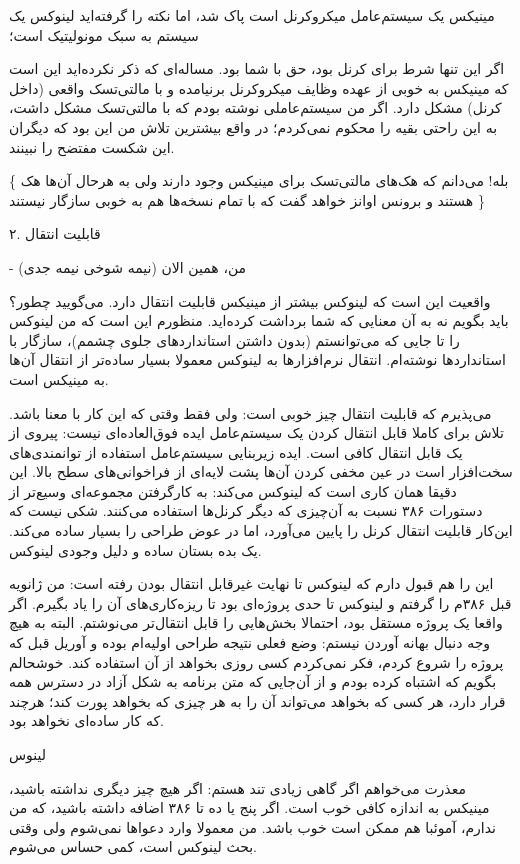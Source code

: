 \begin{emailbox}
مینیکس یک سیستم‌عامل میکروکرنل است {پاک شد، اما نکته را گرفته‌اید}
لینوکس یک سیستم به سبک مونولیتیک‌ است؛

اگر این تنها شرط برای  کرنل بود، حق با شما
بود. مساله‌ای که ذکر نکرده‌اید این است که مینیکس به خوبی از عهده وظایف
میکروکرنل برنیامده و با مالتی‌تسک واقعی (داخل کرنل) مشکل دارد. اگر من
سیستم‌عاملی نوشته بودم که با مالتی‌تسک مشکل داشت، به این راحتی بقیه را
محکوم نمی‌کردم؛ در واقع بیشترین تلاش من این بود که دیگران این شکست
مفتضح را نبینند.

\{ بله! می‌دانم که هک‌های مالتی‌تسک برای مینیکس وجود دارند ولی به هرحال
  آن‌ها هک هستند و برونس اوانز خواهد گفت که با تمام نسخه‌ها هم به خوبی
  سازگار نیستند \}

\noindent ۲. قابلیت انتقال


\hfill - من، همین الان (نیمه شوخی نیمه جدی)

واقعیت این است که لینوکس بیشتر از مینیکس قابلیت انتقال دارد. می‌گویید
چطور؟ باید بگویم نه به آن معنایی که شما برداشت کرده‌اید. منظورم این است
که من لینوکس را تا جایی که می‌توانستم (بدون داشتن استانداردهای 
جلوی چشمم)، سازگار با استانداردها نوشته‌ام. انتقال نرم‌افزارها به لینوکس
معمولا بسیار ساده‌تر از انتقال آن‌ها به مینیکس است.

می‌پذیرم که قابلیت انتقال چیز خوبی است: ولی فقط وقتی که این کار با معنا
باشد. تلاش برای کاملا قابل انتقال کردن یک سیستم‌عامل ایده فوق‌العاده‌ای
نیست: پیروی از یک  قابل انتقال کافی است. ایده زیربنایی
سیستم‌عامل استفاده از توانمندی‌های سخت‌افزار است در عین مخفی کردن آن‌ها
پشت لایه‌ای از فراخوانی‌های سطح بالا. این دقیقا همان کاری است که لینوکس
می‌کند: به کارگرفتن مجموعه‌ای وسیع‌تر از دستورات ۳۸۶ نسبت به آن‌چیزی که
دیگر کرنل‌ها استفاده می‌کنند. شکی نیست که این‌کار قابلیت انتقال کرنل را
پایین می‌آورد، اما در عوض طراحی را بسیار ساده‌ می‌کند. یک بده بستان ساده
و دلیل وجودی لینوکس.

این را هم قبول دارم که لینوکس تا نهایت غیرقابل انتقال بودن رفته است:
من ژانویه قبل ۳۸۶م را گرفتم و لینوکس تا حدی پروژه‌ای بود تا ریزه‌کاری‌های
آن را یاد بگیرم. اگر واقعا یک پروژه مستقل بود، احتمالا بخش‌هایی را قابل
انتقال‌تر می‌نوشتم. البته به هیچ وجه دنبال بهانه آوردن نیستم: وضع فعلی
نتیجه طراحی اولیه‌ام بوده و آوریل قبل که پروژه را شروع کردم، فکر
نمی‌کردم کسی روزی بخواهد از آن استفاده کند. خوشحالم بگویم که اشتباه
کرده بودم و از آن‌جایی که متن برنامه به شکل آزاد در دسترس همه قرار
دارد، هر کسی که بخواهد می‌تواند آن را به هر چیزی که بخواهد پورت کند؛
هرچند که کار ساده‌ای نخواهد بود.

\hfill لینوس

معذرت می‌خواهم اگر گاهی زیادی تند هستم: اگر هیچ چیز دیگری نداشته باشید،
مینیکس به اندازه کافی خوب است. اگر پنج یا ده تا ۳۸۶ اضافه داشته باشید،
که من ندارم، آموئبا هم ممکن است خوب باشد. من معمولا وارد دعواها نمی‌شوم
ولی وقتی بحث لینوکس است، کمی حساس می‌شوم.
\end{emailbox}

